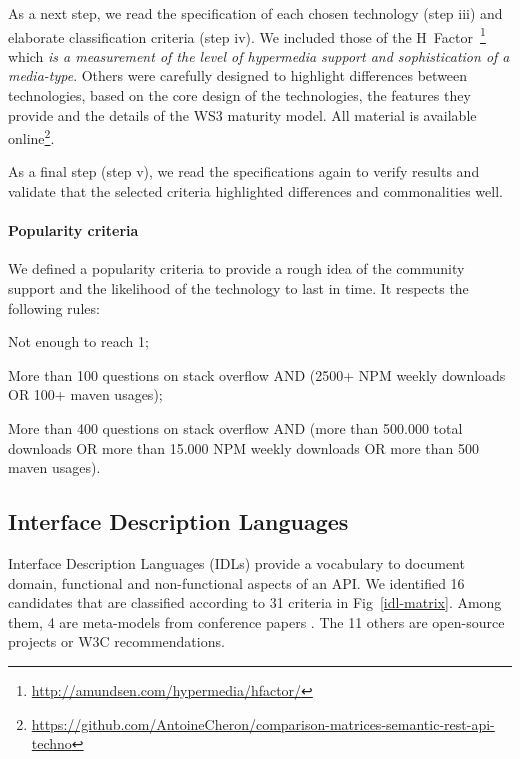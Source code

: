 As a next step, we read the specification of each chosen technology (step iii) and elaborate classification criteria (step iv). We included those of the H~Factor~\footnote{\url{http://amundsen.com/hypermedia/hfactor/}} which \textit{is a measurement of the level of hypermedia support and sophistication of a media-type}. Others were carefully designed to highlight differences between technologies, based on the core design of the technologies, the features they provide and the details of the WS3 maturity model. All material is available online\footnote{\url{https://github.com/AntoineCheron/comparison-matrices-semantic-rest-api-techno}}.

As a final step (step v), we read the specifications again to verify results and validate that the selected criteria highlighted differences and commonalities well.

\paragraph{Popularity criteria}

We defined a popularity criteria to provide a rough idea of the community support and the likelihood of the technology to last in time. It respects the following rules: 
\begin{inparadesc}
    \item [0 -] Not enough to reach 1;
    \item [1 -] More than 100 questions on stack overflow AND (2500+ NPM weekly downloads OR 100+ maven usages);
    \item [2 -] More than 400 questions on stack overflow AND (more than 500.000 total downloads OR more than 15.000 NPM weekly downloads OR more than 500 maven usages).
\end{inparadesc}

\subsection{Interface Description Languages}

Interface Description Languages (IDLs) provide a vocabulary to document domain, functional and non-functional aspects of an API.
We identified 16 candidates that are classified according to 31 criteria in Fig~\ref{idl-matrix}. Among them, 4 are meta-models from conference papers \cite{10.1109/ICWS.2014.30} \cite{Rapido} \cite{Schreier:2011:MRA:1967428.1967434} \cite{10.1007/978-3-642-22233-7_24}. The 11 others are open-source projects or W3C recommendations.

